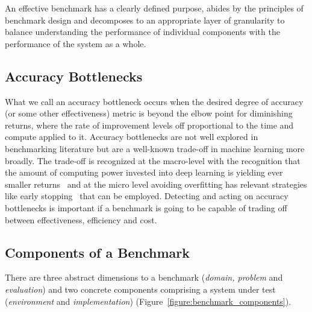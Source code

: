 An effective benchmark has a clearly defined purpose, abides by the principles of benchmark design and decomposes to an appropriate layer of granularity to balance understanding the performance of individual components with the performance of the system as a whole. 

\subsection{Accuracy Bottlenecks}
What we call an accuracy bottleneck occurs when the desired degree of accuracy (or some other effectiveness) metric is beyond the elbow point for diminishing returns, where the rate of improvement levels off proportional to the time and compute applied to it. 
Accuracy bottlenecks are not well explored in \gai benchmarking literature but are a well-known trade-off in machine learning more broadly.
The trade-off is recognized at the macro-level with the recognition that the amount of computing power invested into deep learning is yielding ever smaller returns~\cite{Thompson2021} and at the micro level avoiding overfitting has relevant strategies like early stopping~\cite{Ying2019} that can be employed.
Detecting and acting on accuracy bottlenecks is important if a \gai benchmark is going to be capable of trading off between effectiveness, efficiency and cost. 

\subsection{Components of a Benchmark}
There are three abstract dimensions to a benchmark (\textit{domain, problem} and \textit{evaluation}) and two concrete components comprising a system under test (\textit{environment} and \textit{implementation}) (Figure~\ref{figure:benchmark_components}).


